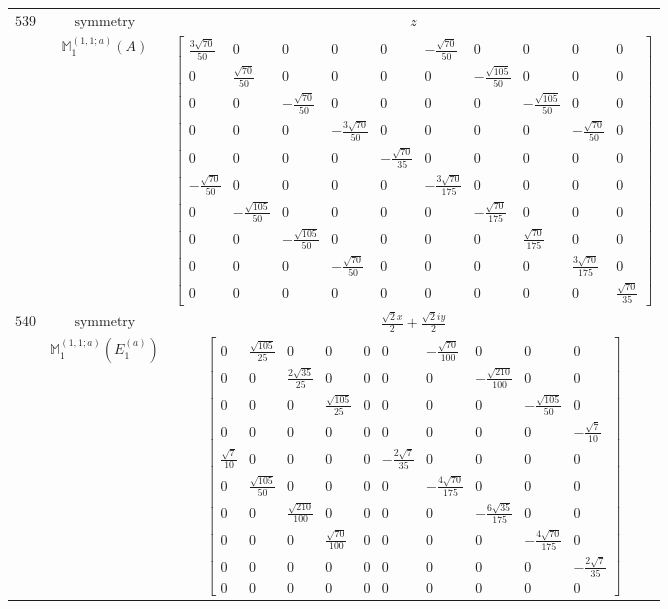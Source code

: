 \documentclass[fleqn,8pt,landscape]{jsarticle}
\begin{document}
\begin{longtable}{ccc}
$ 539 $ & $ \text{symmetry} $ & $ z $ \\
$  $ & $ \mathbb{M}_{1}^{(1,1;a)}(A) $ & $ \begin{bmatrix} \frac{3 \sqrt{70}}{50} & 0 & 0 & 0 & 0 & - \frac{\sqrt{70}}{50} & 0 & 0 & 0 & 0 \\ 0 & \frac{\sqrt{70}}{50} & 0 & 0 & 0 & 0 & - \frac{\sqrt{105}}{50} & 0 & 0 & 0 \\ 0 & 0 & - \frac{\sqrt{70}}{50} & 0 & 0 & 0 & 0 & - \frac{\sqrt{105}}{50} & 0 & 0 \\ 0 & 0 & 0 & - \frac{3 \sqrt{70}}{50} & 0 & 0 & 0 & 0 & - \frac{\sqrt{70}}{50} & 0 \\ 0 & 0 & 0 & 0 & - \frac{\sqrt{70}}{35} & 0 & 0 & 0 & 0 & 0 \\ - \frac{\sqrt{70}}{50} & 0 & 0 & 0 & 0 & - \frac{3 \sqrt{70}}{175} & 0 & 0 & 0 & 0 \\ 0 & - \frac{\sqrt{105}}{50} & 0 & 0 & 0 & 0 & - \frac{\sqrt{70}}{175} & 0 & 0 & 0 \\ 0 & 0 & - \frac{\sqrt{105}}{50} & 0 & 0 & 0 & 0 & \frac{\sqrt{70}}{175} & 0 & 0 \\ 0 & 0 & 0 & - \frac{\sqrt{70}}{50} & 0 & 0 & 0 & 0 & \frac{3 \sqrt{70}}{175} & 0 \\ 0 & 0 & 0 & 0 & 0 & 0 & 0 & 0 & 0 & \frac{\sqrt{70}}{35} \end{bmatrix} $ \\ \hline
$ 540 $ & $ \text{symmetry} $ & $ \frac{\sqrt{2} x}{2} + \frac{\sqrt{2} i y}{2} $ \\
$  $ & $ \mathbb{M}_{1}^{(1,1;a)}(E_{1}^{(a)}) $ & $ \begin{bmatrix} 0 & \frac{\sqrt{105}}{25} & 0 & 0 & 0 & 0 & - \frac{\sqrt{70}}{100} & 0 & 0 & 0 \\ 0 & 0 & \frac{2 \sqrt{35}}{25} & 0 & 0 & 0 & 0 & - \frac{\sqrt{210}}{100} & 0 & 0 \\ 0 & 0 & 0 & \frac{\sqrt{105}}{25} & 0 & 0 & 0 & 0 & - \frac{\sqrt{105}}{50} & 0 \\ 0 & 0 & 0 & 0 & 0 & 0 & 0 & 0 & 0 & - \frac{\sqrt{7}}{10} \\ \frac{\sqrt{7}}{10} & 0 & 0 & 0 & 0 & - \frac{2 \sqrt{7}}{35} & 0 & 0 & 0 & 0 \\ 0 & \frac{\sqrt{105}}{50} & 0 & 0 & 0 & 0 & - \frac{4 \sqrt{70}}{175} & 0 & 0 & 0 \\ 0 & 0 & \frac{\sqrt{210}}{100} & 0 & 0 & 0 & 0 & - \frac{6 \sqrt{35}}{175} & 0 & 0 \\ 0 & 0 & 0 & \frac{\sqrt{70}}{100} & 0 & 0 & 0 & 0 & - \frac{4 \sqrt{70}}{175} & 0 \\ 0 & 0 & 0 & 0 & 0 & 0 & 0 & 0 & 0 & - \frac{2 \sqrt{7}}{35} \\ 0 & 0 & 0 & 0 & 0 & 0 & 0 & 0 & 0 & 0 \end{bmatrix} $ \\ \hline

\end{longtable}
\end{document}
